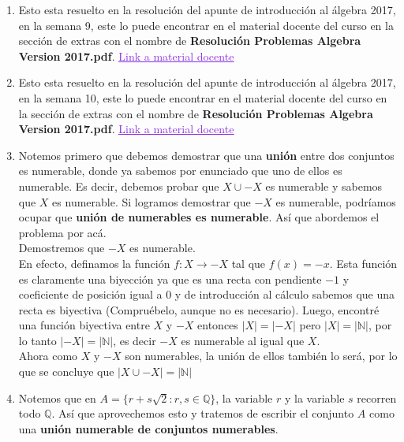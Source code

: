 \documentclass[letterpaper,12pt]{article}
\newcommand{\Q}{\mathbb Q}
\newcommand{\N}{\mathbb N}
\theoremstyle{plain}
\begin{document}
\begin{enumerate}[a)]
\begin{enumerate}[\bf P1.]
        
        \item Esto esta resuelto en la resolución del apunte de introducción al álgebra 2017, en la semana 9, este lo puede encontrar en el material docente del curso en la sección de extras con el nombre de \textbf{Resolución Problemas Algebra Version 2017.pdf}. \href{https://www.u-cursos.cl/ingenieria/2017/1/MA1101/1/material_docente/}{\textcolor{BlueViolet}{\underline{Link a material docente}}}\\
        
        \item Esto esta resuelto en la resolución del apunte de introducción al álgebra 2017, en la semana 10, este lo puede encontrar en el material docente del curso en la sección de extras con el nombre de \textbf{Resolución Problemas Algebra Version 2017.pdf}. \href{https://www.u-cursos.cl/ingenieria/2017/1/MA1101/1/material_docente/}{\textcolor{BlueViolet}{\underline{Link a material docente}}}\\
        
        \newpage
        
        \item Notemos primero que debemos demostrar que una \textbf{unión} entre dos conjuntos es numerable, donde ya sabemos por enunciado que uno de ellos es numerable. Es decir, debemos probar que $X \cup -X$ es numerable y sabemos que $X$ es numerable. Si logramos demostrar que $-X$ es numerable, podríamos ocupar que \textbf{unión de numerables es numerable}. Así que abordemos el problema por acá.\\
        
        Demostremos que $-X$ es numerable.\\
        En efecto, definamos la función $f: X \to -X$ tal que $f(x)=-x$. Esta función es claramente una biyección ya que es una recta con pendiente $-1$ y coeficiente de posición igual a $0$ y de introducción al cálculo sabemos que una recta es biyectiva (Compruébelo, aunque no es necesario).
        Luego, encontré una función biyectiva entre $X$ y $-X$ entonces $|X|=|-X|$ pero $|X|=|\N|$, por lo tanto $|-X|=|\N|$, es decir $-X$ es numerable al igual que $X$.\\
        
        Ahora como $X$ y $-X$ son numerables, la unión de ellos también lo será, por lo que se concluye que $|X\cup -X|=|\N|$\\
        
        \newpage 
        \item Notemos que en $A=\{ r+s\sqrt{2}: r,s \in \Q \}$, la variable $r$ y la variable $s$ recorren todo $\Q$. Así que aprovechemos esto y tratemos de escribir el conjunto $A$ como una \textbf{unión numerable de conjuntos numerables}.\\
        

\end{enumerate}
\end{enumerate}
\end{document}

